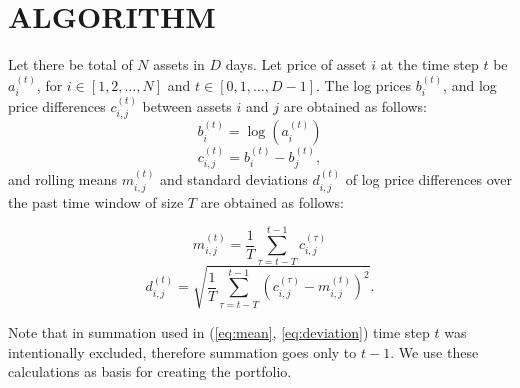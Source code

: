 \documentclass[letterpaper, 10pt, conference]{ieeeconf}
\begin{document}
  
  \section{ALGORITHM} 
  
  Let there be total of $N$ assets in $D$ days.
  Let price of asset $i$ at the time step $t$ be $a_i^{(t)}$, for $i \in {\left[1, 2, \ldots, N\right]}$ and $t \in {\left[0, 1, \ldots, D-1\right]}$.
  The log prices $b_i^{(t)}$, and log price differences $c_{i,j}^{(t)}$ between assets $i$ and $j$ are obtained as follows:
  \begin{equation} b_i^{(t)} = \log\left(a_i^{(t)}\right) \end{equation}
  \begin{equation} c_{i,j}^{(t)} = b_i^{(t)} - b_j^{(t)}, \end{equation}
  and rolling means $m_{i,j}^{(t)}$ and standard deviations $d_{i,j}^{(t)}$ of log price differences over the past time window of size $T$ are obtained as follows:
   
  \begin{equation}
    \label{eq:mean}
    m_{i,j}^{(t)} = \frac{1}{T}\sum_{\tau = t - T}^{t - 1} c_{i,j}^{(\tau)}
  \end{equation}
  \begin{equation}
    \label{eq:deviation}
    d_{i,j}^{(t)} = \sqrt{\frac{1}{T}\sum_{\tau=t - T}^{t - 1} \left(c_{i,j}^{(\tau)} - m_{i,j}^{(t)} \right)^2}.
  \end{equation}
  
  Note that in summation used in (\ref{eq:mean}, \ref{eq:deviation}) time step $t$ was intentionally excluded, therefore summation goes only to $t - 1$.
  We use these calculations as basis for creating the portfolio.
  
\end{document}

